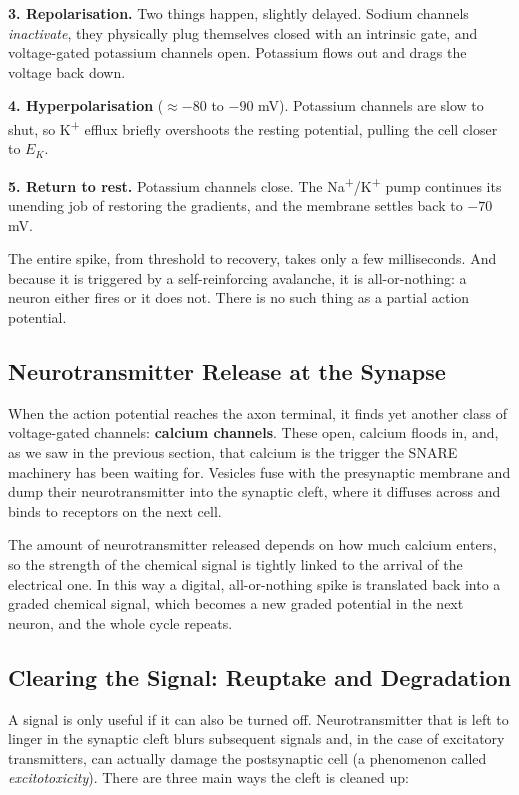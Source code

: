 \documentclass[11pt]{article}
\begin{document}
\textbf{3. Repolarisation.} Two things happen, slightly delayed. Sodium channels \textit{inactivate}, they physically plug themselves closed with an intrinsic gate, and voltage-gated potassium channels open. Potassium flows out and drags the voltage back down.

\textbf{4. Hyperpolarisation} ($\approx -80$ to $-90$ mV). Potassium channels are slow to shut, so K\textsuperscript{+} efflux briefly overshoots the resting potential, pulling the cell closer to $E_K$.

\textbf{5. Return to rest.} Potassium channels close. The Na\textsuperscript{+}/K\textsuperscript{+} pump continues its unending job of restoring the gradients, and the membrane settles back to $-70$ mV.

The entire spike, from threshold to recovery, takes only a few milliseconds. And because it is triggered by a self-reinforcing avalanche, it is all-or-nothing: a neuron either fires or it does not. There is no such thing as a partial action potential.

\subsection{Neurotransmitter Release at the Synapse}

When the action potential reaches the axon terminal, it finds yet another class of voltage-gated channels: \textbf{calcium channels}. These open, calcium floods in, and, as we saw in the previous section, that calcium is the trigger the SNARE machinery has been waiting for. Vesicles fuse with the presynaptic membrane and dump their neurotransmitter into the synaptic cleft, where it diffuses across and binds to receptors on the next cell.

The amount of neurotransmitter released depends on how much calcium enters, so the strength of the chemical signal is tightly linked to the arrival of the electrical one. In this way a digital, all-or-nothing spike is translated back into a graded chemical signal, which becomes a new graded potential in the next neuron, and the whole cycle repeats.

\subsection{Clearing the Signal: Reuptake and Degradation}

A signal is only useful if it can also be turned off. Neurotransmitter that is left to linger in the synaptic cleft blurs subsequent signals and, in the case of excitatory transmitters, can actually damage the postsynaptic cell (a phenomenon called \textit{excitotoxicity}). There are three main ways the cleft is cleaned up:
\end{document}
